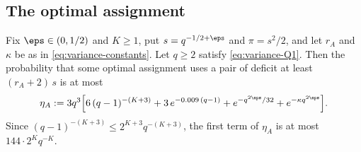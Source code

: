 \subsection{The optimal assignment}\label{sec:variance-assignment}

\begin{proposition}\label{prop:variance-assignment}
Fix $\eps\in(0,1/2)$ and $K\ge1$, put $s=q^{-1/2+\eps}$ and $\pi=s^2/2$, and let $r_A$ and
$\kappa$ be as in \eqref{eq:variance-constants}. Let $q\ge2$ satisfy
\eqref{eq:variance-Q1}. Then the probability that some optimal assignment uses a pair of
deficit at least $(r_A+2)\,s$ is at most
\begin{equation}\label{eq:variance-etaA}
\eta_A:=3q^3\Bigl[6\,(q-1)^{-(K+3)}+3\,e^{-0.009\,(q-1)}+e^{-q^{2\eps}/32}
+e^{-\kappa q^{2\eps}}\Bigr].
\end{equation}
Since $(q-1)^{-(K+3)}\le2^{K+3}q^{-(K+3)}$, the first term of $\eta_A$ is at most
$144\cdot2^K q^{-K}$.
\end{proposition}

